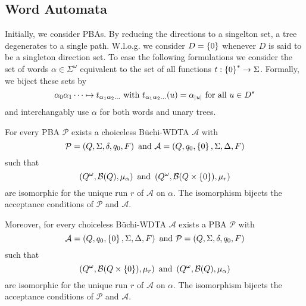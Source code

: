 \subsection{Word Automata}
Initially, we consider \acp{PBA}. By reducing the directions to a singelton
set, a tree degenerates to a single path. W.l.o.g. we consider $D = \left\{0\right\}$
whenever $D$ is said to be a singleton direction set. To ease the following
formulations we consider the set of words $\alpha\in\Sigma^{\omega}$
equivalent to the set of all functions $t:\left\{0\right\}^{*}\rightarrow\Sigma$.
Formally, we biject these sets by
\begin{equation*}
  \alpha_{0}\alpha_{1}\dots \mapsto t_{\alpha_{1}\alpha_{2}\dots}\text{ with }
  t_{\alpha_{1}\alpha_{2}\dots}(u) = \alpha_{\left\vert{u}\right\vert}
  \text{ for all }u\in D^{*}
\end{equation*}
and interchangably use $\alpha$ for both words and unary trees.
\begin{lemma}
  For every \ac{PBA} $\mathcal{P}$ exists a choiceless Büchi-\ac{WDTA}
  $\mathcal{A}$ with
  \begin{equation*}
    \mathcal{P} = \left(Q, \Sigma, \delta, q_{0}, F\right)
    \text{ and }
    \mathcal{A} = \left(Q, q_{0}, \left\{0\right\}, \Sigma, \Delta, F\right)
  \end{equation*}
  such that
  \begin{equation*}
    \left(Q^{\omega}, \mathcal{B}(Q), \mu_{\alpha}\right)\text{ and }
    \left(Q^{\omega}, \mathcal{B}(Q\times\left\{0\right\}), \mu_{r}\right)
  \end{equation*}
  are isomorphic for the unique run $r$ of $\mathcal{A}$ on $\alpha$.
  The isomorphism bijects the acceptance conditions of $\mathcal{P}$ and
  $\mathcal{A}$.

  Moreover, for every choiceless Büchi-\ac{WDTA} $\mathcal{A}$ 
  exists a \ac{PBA} $\mathcal{P}$ with
  \begin{equation*}
    \mathcal{A} = \left(Q, q_{0}, \left\{0\right\}, \Sigma, \Delta, F\right)
    \text{ and }
    \mathcal{P} = \left(Q, \Sigma, \delta, q_{0}, F\right)
  \end{equation*}
  such that
  \begin{equation*}
    \left(Q^{\omega}, \mathcal{B}(Q\times\left\{0\right\}), \mu_{r}\right)\text{ and }
    \left(Q^{\omega}, \mathcal{B}(Q), \mu_{\alpha}\right)
  \end{equation*}
  are isomorphic for the unique run $r$ of $\mathcal{A}$ on $\alpha$.
  The isomorphism bijects the acceptance conditions of $\mathcal{P}$ and
  $\mathcal{A}$.
  \label{lem:pbaaswdta}
\end{lemma}
